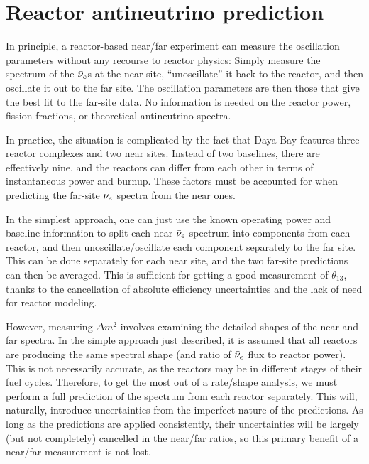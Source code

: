 \documentclass[../thesis.tex]{subfiles}
\begin{document}
\chapter{Reactor antineutrino prediction}
\label{chap:reactor}

\begin{comment}
Note to self: See Kam-Biu's comments on first page of Reactor.pdf. Add SNF plot from DocDB. Also NE corrections (tabulate or plot, take from [Lewis] or [Mueller]?)
\end{comment}

In principle, a reactor-based near/far experiment can measure the oscillation parameters without any recourse to reactor physics: Simply measure the spectrum of the $\bar\nu_e$s at the near site, ``unoscillate'' it back to the reactor, and then oscillate it out to the far site. The oscillation parameters are then those that give the best fit to the far-site data. No information is needed on the reactor power, fission fractions, or theoretical antineutrino spectra.

In practice, the situation is complicated by the fact that Daya Bay features three reactor complexes and two near sites. Instead of two baselines, there are effectively nine, and the reactors can differ from each other in terms of instantaneous power and burnup. These factors must be accounted for when predicting the far-site $\bar\nu_e$ spectra from the near ones.

In the simplest approach, one can just use the known operating power and baseline information to split each near $\bar\nu_e$ spectrum into components from each reactor, and then unoscillate/oscillate each component separately to the far site. This can be done separately for each near site, and the two far-site predictions can then be averaged. This is sufficient for getting a good measurement of $\theta_{13}$, thanks to the cancellation of absolute efficiency uncertainties and the lack of need for reactor modeling.

However, measuring $\Delta m^2$ involves examining the detailed shapes of the near and far spectra. In the simple approach just described, it is assumed that all reactors are producing the same spectral shape (and ratio of $\bar\nu_e$ flux to reactor power). This is not necessarily accurate, as the reactors may be in different stages of their fuel cycles. Therefore, to get the most out of a rate/shape analysis, we must perform a full prediction of the spectrum from each reactor separately. This will, naturally, introduce uncertainties from the imperfect nature of the predictions. As long as the predictions are applied consistently, their uncertainties will be largely (but not completely) cancelled in the near/far ratios, so this primary benefit of a near/far measurement is not lost.
\end{document}

